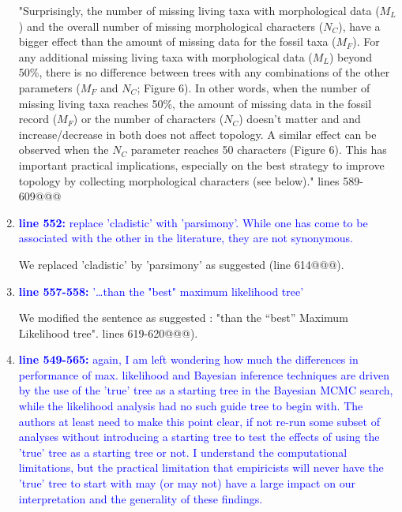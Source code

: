 \documentclass[12pt,letterpaper]{article}
\begin{document}
\begin{enumerate}
"Surprisingly, the number of missing living taxa with morphological data ($M_{L}$) and the overall number of missing morphological characters ($N_{C}$), have a bigger effect than the amount of missing data for the fossil taxa ($M_{F}$).
For any additional missing living taxa with morphological data ($M_L$) beyond 50\%, there is no difference between trees with any combinations of the other parameters ($M_F$ and $N_C$; Figure 6).
In other words, when the number of missing living taxa reaches 50\%, the amount of missing data in the fossil record ($M_F$) or the number of characters ($N_C$) doesn't matter and and increase/decrease in both does not affect topology.
A similar effect can be observed when the $N_C$ parameter reaches 50 characters (Figure 6).
This has important practical implications, especially on the best strategy to improve topology by collecting morphological characters (see below)." lines 589-609@@@

\item{\textcolor{blue}{\textbf{line 552:} replace 'cladistic' with 'parsimony'. While one has come to be associated with the other in the literature, they are not synonymous. }}

We replaced 'cladistic' by 'parsimony' as suggested (line 614@@@).

\item{\textcolor{blue}{\textbf{line 557-558:} '…than the "best" maximum likelihood tree'}}

We modified the sentence as suggested : "than the ``best'' Maximum Likelihood tree". lines 619-620@@@).

\item{\textcolor{blue}{\textbf{line 549-565:} again, I am left wondering how much the differences in performance of max. likelihood and Bayesian inference techniques are driven by the use of the 'true' tree as a starting tree in the Bayesian MCMC search, while the likelihood analysis had no such guide tree to begin with. The authors at least need to make this point clear, if not re-run some subset of analyses without introducing a starting tree to test the effects of using the 'true' tree as a starting tree or not. I understand the computational limitations, but the practical limitation that empiricists will never have the 'true' tree to start with may (or may not) have a large impact on our interpretation and the generality of these findings. }}


\end{enumerate}
\end{document}
